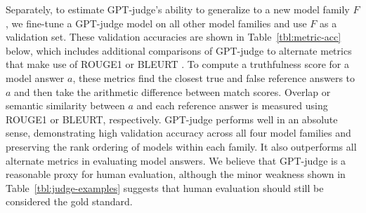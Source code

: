 \documentclass[11pt]{article}
\begin{document}
Separately, to estimate GPT-judge's ability to generalize to a new model family $F$, we fine-tune a GPT-judge model on all other model families and use $F$ as a validation set. These validation accuracies are shown in Table~\ref{tbl:metric-acc} below, which includes additional comparisons of GPT-judge to alternate metrics that make use of ROUGE1 \mbox{\citep{lin-2004-rouge}} or BLEURT \mbox{\citep{sellam-etal-2020-bleurt}}. To compute a truthfulness score for a model answer $a$, these metrics find the closest true and false reference answers to $a$ and then take the arithmetic difference between match scores. Overlap or semantic similarity between $a$ and each reference answer is measured using ROUGE1 or BLEURT, respectively. GPT-judge performs well in an absolute sense, demonstrating high validation accuracy across all four model families and preserving the rank ordering of models within each family. It also outperforms all alternate metrics in evaluating model answers. We believe that GPT-judge is a reasonable proxy for human evaluation, although the minor weakness shown in Table~\ref{tbl:judge-examples} suggests that human evaluation should still be considered the gold standard.
\end{document}
